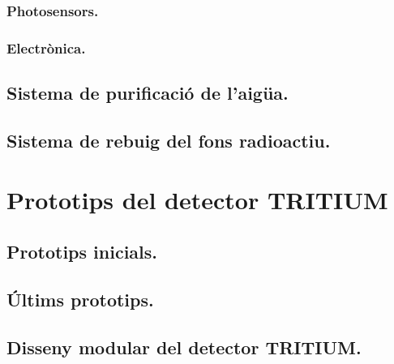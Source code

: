 \documentclass[12pt,a4paper]{book}
\begin{document}
			\subsubsection{Photosensors.}\label{subsec:Fotosensors}
			 
			
			\subsubsection{Electrònica.}\label{subsec:Electrònica}
			 
		
	\subsection{Sistema de purificació de l'aigüa.}\label{subsec:SistemaPurificacio}
		 
		
	\subsection{Sistema de rebuig del fons radioactiu.}\label{subsec:SistemaRebuigFons}
		 

\section{Prototips del detector TRITIUM}\label{subsec:Prototips}
		 
	
	\subsection{Prototips inicials.}\label{subsec:PrototipsInicials}
		 
		
	\subsection{Últims prototips.}\label{subsec:UltimsPrototips}
		 
		
	\subsection{Disseny modular del detector TRITIUM.}\label{subsec:DisenyModular}
		 
\end{document}
